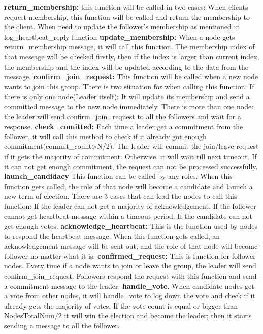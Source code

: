 \documentclass[a4paper,11pt]{article}
\begin{document}
\begin{outline}
\1 \textbf{return\_membership:} this function will be called in two cases:
  \2 When clients request membership, this function will be called and return the membership to the client.
  \2 When need to update the follower's membership as mentioned in log\_heartbeat\_reply function
\1 \textbf{update\_membership:} When a node gets return\_membership message, it will call this function. The membership index of that message will be checked firstly, then if the index is larger than current index, the membership and the index will be updated according to the data from the message.
\1 \textbf{confirm\_join\_request:} This function will be called when a new node wants to join this group. There is two situation for when calling this function:
  \2 If there is only one node(Leader itself): It will update its membership and send a committed message to the new node immediately.
  \2 There is more than one node: the leader will send confirm\_join\_request to all the followers and wait for a response.
\1 \textbf{check\_comitted:} Each time a leader get a commitment from the follower, it will call this method to check if it already got enough commitment(commit\_count>N/2). The leader will commit the join/leave request if it gets the majority of commitment. Otherwise, it will wait till next timeout. If it can not get enough commitment, the request can not be processed successfully.
\1 \textbf{launch\_candidacy} This function can be called by any roles. When this function gets called, the role of that node will become a candidate and launch a new term of election. There are 3 cases that can lead the nodes to call this function:
  \2 If the leader can not get a majority of acknowledgement.
  \2 If the follower cannot get heartbeat message within a timeout period.
  \2 If the candidate can not get enough votes.
\1 \textbf{acknowledge\_heartbeat:} This is the function used by nodes to respond the heartbeat message. When this function gets called, an acknowledgement message will be sent out, and the role of that node will become follower no matter what it is.
\1 \textbf{confirmed\_request:} This is function for follower nodes. Every time if a node wants to join or leave the group, the leader will send confirm\_join\_request. Followers respond the request with this function and send a commitment message to the leader.
\1 \textbf{handle\_vote}. When candidate nodes get a vote from other nodes, it will handle\_vote to log down the vote and check if it already gets the majority of votes. If the vote count is equal or bigger than NodesTotalNum/2 it will win the election and become the leader; then it starts sending a message to all the follower.
\end{outline}
\end{document}
